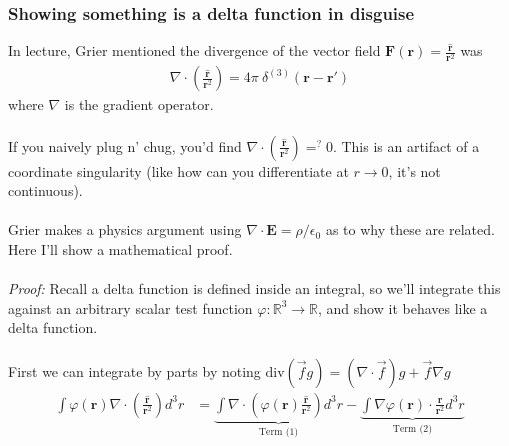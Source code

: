 \documentclass[12pt,fleqn]{article}
\numberwithin{equation}{section} %
\begin{document}
\subsubsection{Showing something is a delta function in disguise}
In lecture, Grier mentioned the divergence of the vector field $\mathbf F(\mathbf r) = \frac{\mathbf{\hat{r}}}{\mathbf r^2}$ was
\begin{align}
	\boxed{\nabla \cdot \left ( \frac{\mathbf{\hat{r}}}{\mathbf r^2}\right) = 4\pi ~\delta^{(3)} (\mathbf r - \mathbf r')}
\end{align}
where $\nabla$ is the gradient operator.\\
\\
If you naively plug n' chug, you'd find $\nabla \cdot \left ( \frac{\mathbf{\hat{r}}}{\mathbf r^2}\right) =^? 0$. This is an artifact of a coordinate singularity (like how can you differentiate at $r \to 0$, it's not continuous). \\
\\
Grier makes a physics argument using $\nabla \cdot \mathbf E =  \rho / \epsilon_0$ as to why these are related. Here I'll show a mathematical proof.
\\
\\
\emph{Proof:} Recall a delta function is defined inside an integral, so we'll integrate this against an arbitrary scalar test function $\varphi : \mathbb R^3 \to \mathbb R$, and show it behaves like a delta function.\\
\\
First we can integrate by parts by noting $\text{div}(\vec f g) = (\nabla \cdot \vec f) g + \vec f \nabla g$
\begin{align}
	\int \varphi(\mathbf r) \nabla \cdot \left( \frac{\mathbf{\hat{r}}}{\mathbf r^2} \right) d^3 r & = \underbrace{\int \nabla\cdot (\varphi(\mathbf r) \frac{\mathbf{\hat{r}}}{\mathbf r^2}) d^3r}_{\text{Term (1)}} - \underbrace{\int \nabla\varphi(\mathbf r) \cdot \frac{\mathbf{\hat{r}}}{\mathbf r^2} d^3r}_{\text{Term (2)}}
\end{align}
\end{document}
